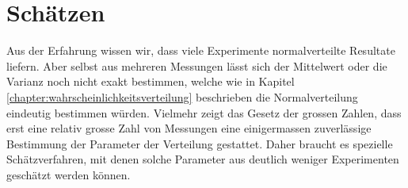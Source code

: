 %
%
%
\chapter{Schätzen}
\label{chapter:schaetzen}
Aus der Erfahrung wissen wir, dass viele Experimente normalverteilte Resultate
liefern.
Aber selbst aus mehreren Messungen lässt sich der Mittelwert
oder die Varianz noch nicht exakt bestimmen,
welche wie in Kapitel \ref{chapter:wahrscheinlichkeitsverteilung}
beschrieben die Normalverteilung eindeutig bestimmen würden.
Vielmehr zeigt das Gesetz der grossen Zahlen, dass erst eine
relativ grosse Zahl von Messungen eine einigermassen zuverlässige
Bestimmung der Parameter der Verteilung gestattet.
Daher braucht es spezielle Schätzverfahren, mit denen solche Parameter
aus deutlich weniger Experimenten geschätzt werden können.










